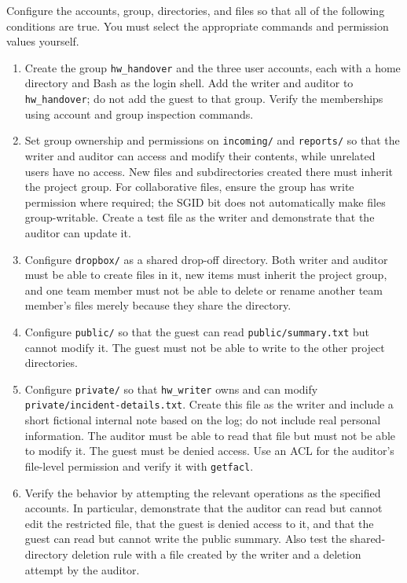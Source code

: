 Configure the accounts, group, directories, and files so that all of the following conditions are true. You must select the appropriate commands and permission values yourself.

\begin{enumerate}
    \item Create the group \texttt{hw\_handover} and the three user accounts, each with a home directory and Bash as the login shell. Add the writer and auditor to \texttt{hw\_handover}; do not add the guest to that group. Verify the memberships using account and group inspection commands.
    \item Set group ownership and permissions on \texttt{incoming/} and \texttt{reports/} so that the writer and auditor can access and modify their contents, while unrelated users have no access. New files and subdirectories created there must inherit the project group. For collaborative files, ensure the group has write permission where required; the SGID bit does not automatically make files group-writable. Create a test file as the writer and demonstrate that the auditor can update it.
    \item Configure \texttt{dropbox/} as a shared drop-off directory. Both writer and auditor must be able to create files in it, new items must inherit the project group, and one team member must not be able to delete or rename another team member's files merely because they share the directory.
    \item Configure \texttt{public/} so that the guest can read \texttt{public/summary.txt} but cannot modify it. The guest must not be able to write to the other project directories.
    \item Configure \texttt{private/} so that \texttt{hw\_writer} owns and can modify \texttt{private/incident-details.txt}. Create this file as the writer and include a short fictional internal note based on the log; do not include real personal information. The auditor must be able to read that file but must not be able to modify it. The guest must be denied access. Use an ACL for the auditor's file-level permission and verify it with \texttt{getfacl}.
    \item Verify the behavior by attempting the relevant operations as the specified accounts. In particular, demonstrate that the auditor can read but cannot edit the restricted file, that the guest is denied access to it, and that the guest can read but cannot write the public summary. Also test the shared-directory deletion rule with a file created by the writer and a deletion attempt by the auditor.
\end{enumerate}

